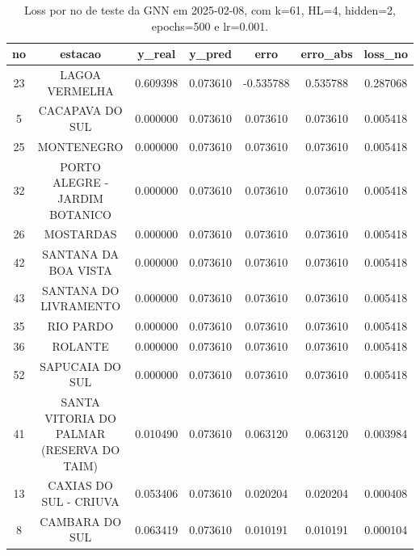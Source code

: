 \begin{table}[h]
\centering
\caption{Loss por no de teste da GNN em 2025-02-08, com k=61, HL=4, hidden=2, epochs=500 e lr=0.001.}
\label{tab:gnn_loss_k61_hl4_h2_e500_d20250208}
\begin{tabular}{ccccccc}
\toprule
no & estacao & y\_real & y\_pred & erro & erro\_abs & loss\_no \\
\midrule
23 & LAGOA VERMELHA & 0.609398 & 0.073610 & -0.535788 & 0.535788 & 0.287068 \\
5 & CACAPAVA DO SUL & 0.000000 & 0.073610 & 0.073610 & 0.073610 & 0.005418 \\
25 & MONTENEGRO & 0.000000 & 0.073610 & 0.073610 & 0.073610 & 0.005418 \\
32 & PORTO ALEGRE - JARDIM BOTANICO & 0.000000 & 0.073610 & 0.073610 & 0.073610 & 0.005418 \\
26 & MOSTARDAS & 0.000000 & 0.073610 & 0.073610 & 0.073610 & 0.005418 \\
42 & SANTANA DA BOA VISTA & 0.000000 & 0.073610 & 0.073610 & 0.073610 & 0.005418 \\
43 & SANTANA DO LIVRAMENTO & 0.000000 & 0.073610 & 0.073610 & 0.073610 & 0.005418 \\
35 & RIO PARDO & 0.000000 & 0.073610 & 0.073610 & 0.073610 & 0.005418 \\
36 & ROLANTE & 0.000000 & 0.073610 & 0.073610 & 0.073610 & 0.005418 \\
52 & SAPUCAIA DO SUL & 0.000000 & 0.073610 & 0.073610 & 0.073610 & 0.005418 \\
41 & SANTA VITORIA DO PALMAR (RESERVA DO TAIM) & 0.010490 & 0.073610 & 0.063120 & 0.063120 & 0.003984 \\
13 & CAXIAS DO SUL - CRIUVA & 0.053406 & 0.073610 & 0.020204 & 0.020204 & 0.000408 \\
8 & CAMBARA DO SUL & 0.063419 & 0.073610 & 0.010191 & 0.010191 & 0.000104 \\
\bottomrule
\end{tabular}
\end{table}

